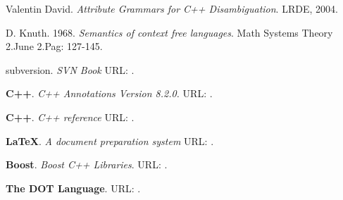 \begin{thebibliography}{10}
 Valentin David. \textit{Attribute Grammars for C++ Disambiguation}. LRDE, 2004.

 D. Knuth. 1968. \textit{Semantics of context free languages}. Math Systems Theory 2.June 2.Pag: 127-145.

 subversion. \textit{SVN Book} URL: .
% 
% 

 \textbf{C++}. \textit{C++ Annotations Version 8.2.0.} URL: . 

 \textbf{C++}. \textit{C++ reference} URL: . 

 \textbf{\LaTeX}. \textit{A document preparation system} URL: .

 \textbf{Boost}. \textit{Boost C++ Libraries}. URL: . 

 \textbf{The DOT Language}. URL: .
 
\end{thebibliography}



